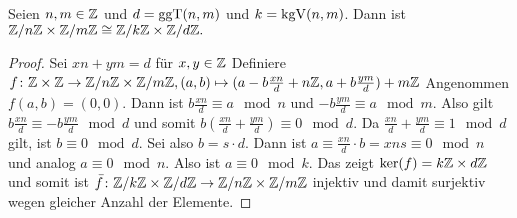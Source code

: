 \begin{Lemma}\label{Lem:ChinRest1}
    Seien $n,m\in\mathbb{Z}$ und $d=\operatorname{ggT}(n,m)$ und $k=\operatorname{kgV}(n,m)$.
    Dann ist $\mathbb{Z}/n\mathbb{Z}\times\mathbb{Z}/m\mathbb{Z}\cong \mathbb{Z}/k\mathbb{Z}\times\mathbb{Z}/d\mathbb{Z}.$
\end{Lemma}
\begin{proof}
    Sei $xn+ym=d$ für $x,y\in \mathbb{Z}$
    Definiere $f\colon \mathbb{Z}\times \mathbb{Z}\to\mathbb{Z}/n\mathbb{Z}\times\mathbb{Z}/m\mathbb{Z}, (a,b)\mapsto (a-b\frac{xn}{d}+n\mathbb{Z},a+b\frac{ym}{d})+m\mathbb{Z}$
    Angenommen $f(a,b)=(0,0)$. Dann ist $b\frac{xn}{d}\equiv a \mod n$ und $-b\frac{ym}{d}\equiv a\mod m$. Also gilt $b\frac{xn}{d}\equiv -b\frac{ym}{d} \mod d$ und somit $b(\frac{xn}{d}+\frac{ym}{d})\equiv 0 \mod d$. Da $\frac{xn}{d}+\frac{ym}{d}\equiv 1\mod d$ gilt, ist $b\equiv 0 \mod d$. Sei also $b=s\cdot d$. Dann ist $a\equiv \frac{xn}{d}\cdot b=xns\equiv 0\mod n$ und analog $a\equiv 0 \mod n$. Also ist $a\equiv 0\mod k$. Das zeigt $\ker(f)=k\mathbb{Z}\times d\mathbb{Z}$ und somit ist $\bar f\colon \mathbb{Z}/k\mathbb{Z}\times \mathbb{Z}/d\mathbb{Z}\to \mathbb{Z}/n\mathbb{Z}\times \mathbb{Z}/m\mathbb{Z}$ injektiv und damit surjektiv wegen gleicher Anzahl der Elemente.
\end{proof}

